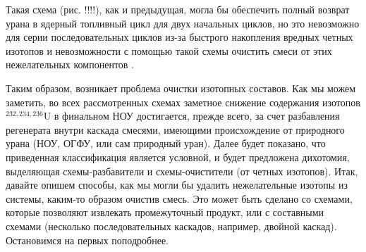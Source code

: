 Такая схема (рис. !!!!), как и предыдущая, могла бы обеспечить полный возврат урана в ядерный топливный цикл для двух начальных циклов, но это невозможно для серии последовательных циклов из-за быстрого накопления вредных четных изотопов и невозможности с помощью такой схемы очистить смеси от этих нежелательных компонентов \cite{smirnovApplyingEnrichmentCapacities2018}.

Таким образом, возникает проблема очистки изотопных составов.
Как мы можем заметить, во всех рассмотренных схемах заметное снижение содержания изотопов $^{232,234,236}$U в финальном НОУ достигается, прежде всего, за счет разбавления регенерата внутри каскада смесями, имеющими происхождение от природного урана (НОУ, ОГФУ, или сам природный уран). Далее будет показано, что приведенная классификация является условной, и будет предложена дихотомия, выделяющая схемы-разбавители и схемы-очистители (от четных изотопов). Итак, давайте опишем способы, как мы могли бы удалить нежелательные изотопы из системы, каким-то образом очистив смесь. Это может быть сделано со схемами, которые позволяют извлекать промежуточный продукт, или с составными схемами (несколько последовательных каскадов, например, двойной каскад). Остановимся на первых поподробнее.

